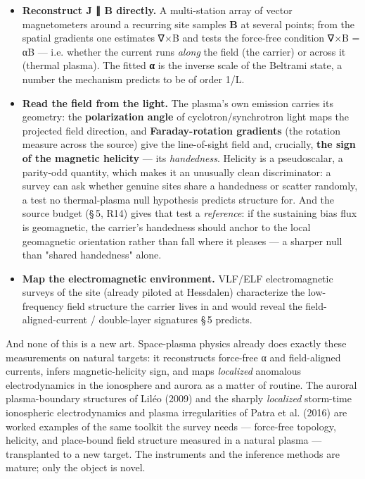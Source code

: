 \documentclass[11pt]{article}
\begin{document}
\begin{itemize}
\item \textbf{Reconstruct J ∥ B directly.} A multi-station array of vector magnetometers around a recurring site samples \textbf{B} at several points; from the spatial gradients one estimates ∇×B and tests the force-free condition ∇×B = αB --- i.e. whether the current runs \emph{along} the field (the carrier) or across it (thermal plasma). The fitted \textbf{α} is the inverse scale of the Beltrami state, a number the mechanism predicts to be of order 1/L.
\item \textbf{Read the field from the light.} The plasma's own emission carries its geometry: the \textbf{polarization angle} of cyclotron/synchrotron light maps the projected field direction, and \textbf{Faraday-rotation gradients} (the rotation measure across the source) give the line-of-sight field and, crucially, \textbf{the sign of the magnetic helicity} --- its \emph{handedness}. Helicity is a pseudoscalar, a parity-odd quantity, which makes it an unusually clean discriminator: a survey can ask whether genuine sites share a handedness or scatter randomly, a test no thermal-plasma null hypothesis predicts structure for. And the source budget (\S\,5, R14) gives that test a \emph{reference}: if the sustaining bias flux is geomagnetic, the carrier's handedness should anchor to the local geomagnetic orientation rather than fall where it pleases --- a sharper null than "shared handedness" alone.
\item \textbf{Map the electromagnetic environment.} VLF/ELF electromagnetic surveys of the site (already piloted at Hessdalen) characterize the low-frequency field structure the carrier lives in and would reveal the field-aligned-current / double-layer signatures \S\,5 predicts.
\end{itemize}

And none of this is a new art. Space-plasma physics already does exactly these measurements on natural targets: it reconstructs force-free α and field-aligned currents, infers magnetic-helicity sign, and maps \emph{localized} anomalous electrodynamics in the ionosphere and aurora as a matter of routine. The auroral plasma-boundary structures of Liléo (2009) and the sharply \emph{localized} storm-time ionospheric electrodynamics and plasma irregularities of Patra et al. (2016) are worked examples of the same toolkit the survey needs --- force-free topology, helicity, and place-bound field structure measured in a natural plasma --- transplanted to a new target. The instruments and the inference methods are mature; only the object is novel.
\end{document}
